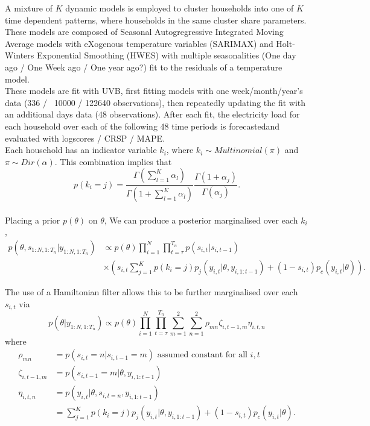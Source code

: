 \documentclass[12pt,a4paper]{article}\usepackage[]{graphicx}\usepackage[]{color}
\begin{document}
A mixture of $K$ dynamic models is employed to cluster households into one of $K$ time dependent patterns, where households in the same cluster share parameters. These models are composed of Seasonal Autogregressive Integrated Moving Average models with eXogenous temperature variables (SARIMAX) and Holt-Winters Exponential Smoothing (HWES) with multiple seasonalities (One day ago / One Week ago / One year ago?) fit to the residuals of a temperature model.
\\

These models are fit with UVB, first fitting models with one week/month/year's data (336 / ~10000 / 122640 observations), then repeatedly updating the fit with an additional days data (48 observations). After each fit, the electricity load for each household over each of the following 48 time periods is forecastedand evaluated with logscores / CRSP / MAPE.
\\

Each household has an indicator variable $k_i$, where $k_i \sim Multinomial(\pi)$ and $\pi \sim Dir(\alpha)$. This combination implies that
\begin{equation}
\label{kMarginalElec}
p(k_i = j) = \frac{\Gamma(\sum_{l=1}^K \alpha_l)}{\Gamma(1 + \sum_{l=1}^K \alpha_l)} \frac{\Gamma(1 + \alpha_j)}{\Gamma(\alpha_j)}.
\end{equation}
\\

Placing a prior $p(\theta)$ on $\theta$, We can produce a posterior marginalised over each $k_i$,
\begin{align}
\label{marginaliseK}
p(\theta, s_{1:N, 1:T_n} | y_{1:N, 1:T_n}) &\propto p(\theta) \prod_{i=1}^N \prod_{t=\tau}^{T_n} p(s_{i, t} | s_{i, t-1}) \nonumber \\
&\times  \left(s_{i, t} \sum_{j=1}^K p(k_i = j)p_j(y_{i, t} | \theta, y_{i, 1:t-1}) + (1 - s_{i, t}) p_c(y_{i, t} | \theta) \right).
\end{align}

The use of a Hamiltonian filter allows this to be further marginalised over each $s_{i, t}$ via
\begin{equation}
p(\theta | y_{1:N, 1:T_n}) \propto p(\theta)  \prod_{i=1}^N \prod_{t=\tau}^{T_n} \sum_{m=1}^2 \sum_{n=1}^2 \rho_{mn} \zeta_{i, t-1, m} \eta_{i, t, n}
\end{equation}
where
\begin{align}
\rho_{mn} &= p(s_{i, t} = n | s_{i, t-1} = m) \mbox{ assumed constant for all } i, t \\
\zeta_{i, t-1, m} &= p(s_{i, t-1} = m | \theta, y_{i, 1:t-1}) \\
\eta_{i, t, n} &= p(y_{i, t} | \theta, s_{i, t = n}, y_{i, 1:t-1}) \\
&= \sum_{j=1}^K p(k_i = j)p_j(y_{i, t} | \theta, y_{i, 1:t-1}) + (1 - s_{i, t}) p_c(y_{i, t} | \theta).
\end{align}
\end{document}
